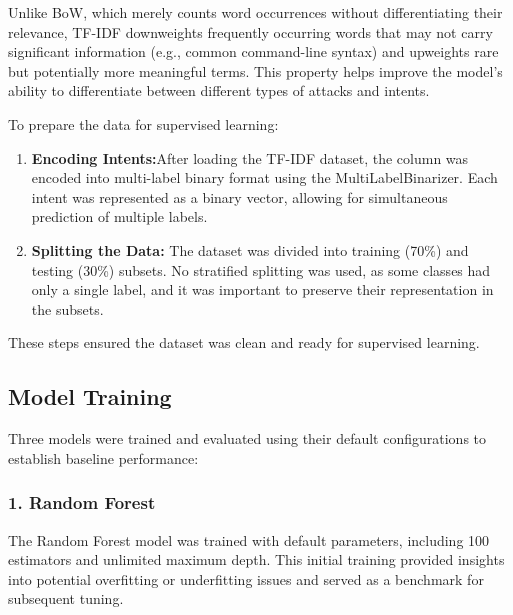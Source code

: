         Unlike BoW, which merely counts word occurrences without differentiating their relevance, TF-IDF downweights frequently occurring words that may not carry significant information (e.g., common command-line syntax) and upweights rare but potentially more meaningful terms. This property helps improve the model's ability to differentiate between different types of attacks and intents.
    
        \noindent To prepare the data for supervised learning:

        \begin{enumerate}
    
            \item \textbf{Encoding Intents:}After loading the TF-IDF dataset, the  column was encoded into multi-label binary format using the MultiLabelBinarizer. Each intent was represented as a binary vector, allowing for simultaneous prediction of multiple labels.
            
            \item \textbf{Splitting the Data:} The dataset was divided into training (70\%) and testing (30\%) subsets. No stratified splitting was used, as some classes had only a single label, and it was important to preserve their representation in the subsets.
        
        \end{enumerate}

        \noindent These steps ensured the dataset was clean and ready for supervised learning.

    \subsection{Model Training}
    
        Three models were trained and evaluated using their default configurations to establish baseline performance:

        \subsubsection*{1. Random Forest \\}
        
        
            The Random Forest model was trained with default parameters, including 100 estimators and unlimited maximum depth. This initial training provided insights into potential overfitting or underfitting issues and served as a benchmark for subsequent tuning.


